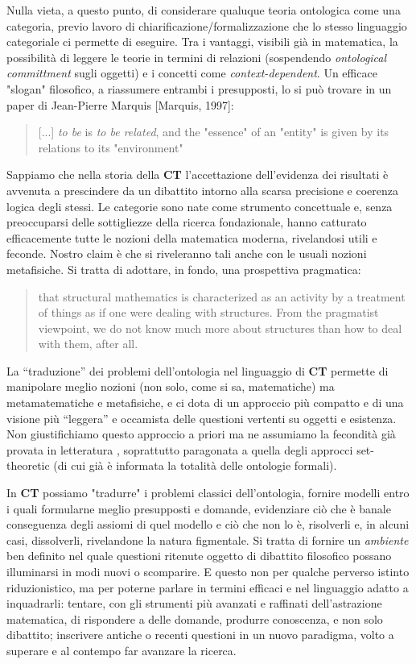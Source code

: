 \documentclass[a4paper, 11pt]{article}
\begin{document}
	 Nulla vieta, a questo punto, di considerare qualuque teoria ontologica come una categoria, previo lavoro di chiarificazione/formalizzazione che lo stesso linguaggio categoriale ci permette di eseguire. Tra i vantaggi, visibili già in matematica, la possibilità di leggere le teorie in termini di relazioni (sospendendo \emph{ontological committment} sugli oggetti) e i concetti come \emph{context-dependent}. Un efficace "slogan" filosofico, a riassumere entrambi i presupposti, lo si può trovare in un paper di Jean-Pierre Marquis [Marquis, 1997]:
	 \begin{quote}
	 	[...] \emph{to be} is \emph{to be related}, and the "essence" of an "entity" is given by its relations to its "environment"
	 \end{quote}
	 
	  Sappiamo che nella storia della \textbf{CT} l'accettazione dell'evidenza dei risultati è avvenuta a prescindere da un dibattito intorno alla scarsa precisione e coerenza logica degli stessi. Le categorie sono nate come strumento concettuale e, senza preoccuparsi delle sottigliezze della ricerca fondazionale, hanno catturato efficacemente tutte le nozioni della matematica moderna, rivelandosi utili e feconde. Nostro claim è che si riveleranno tali anche con le usuali nozioni metafisiche. Si tratta di adottare, in fondo, una prospettiva pragmatica:
	  \begin{quotation}
	  	that structural mathematics is characterized as an activity by a treatment of things as if one were dealing with structures. From the pragmatist viewpoint, we do not know much more about structures than how to deal with them, after all.
	  \end{quotation}
	  La ``traduzione'' dei problemi dell'ontologia nel linguaggio di \textbf{CT} permette di manipolare meglio nozioni (non solo, come si sa, matematiche) ma metamatematiche e metafisiche, e ci dota di un approccio più compatto e di una visione più ``leggera'' e occamista delle questioni vertenti su oggetti e esistenza. Non giustifichiamo questo approccio a priori ma ne assumiamo la fecondità già provata in letteratura \endfo, soprattutto paragonata a quella degli approcci set-theoretic (di cui già è informata la totalità delle ontologie formali).
	 
	 In \textbf{CT} possiamo "tradurre" i problemi classici dell'ontologia, fornire modelli entro i quali formularne meglio presupposti e domande, evidenziare ciò che è banale conseguenza degli assiomi di quel modello e ciò che non lo è, risolverli e, in alcuni casi, dissolverli, rivelandone la natura figmentale. Si tratta di fornire un \emph{ambiente} ben definito nel quale questioni ritenute oggetto di dibattito filosofico possano illuminarsi in modi nuovi o scomparire. E questo non per qualche perverso istinto riduzionistico, ma per poterne parlare in termini efficaci e nel linguaggio adatto a inquadrarli: tentare, con gli strumenti più avanzati e raffinati dell'astrazione matematica, di rispondere a delle domande, produrre conoscenza, e non solo dibattito; inscrivere antiche o recenti questioni in un nuovo paradigma, volto a superare e al contempo far avanzare la ricerca.
	
\end{document}
